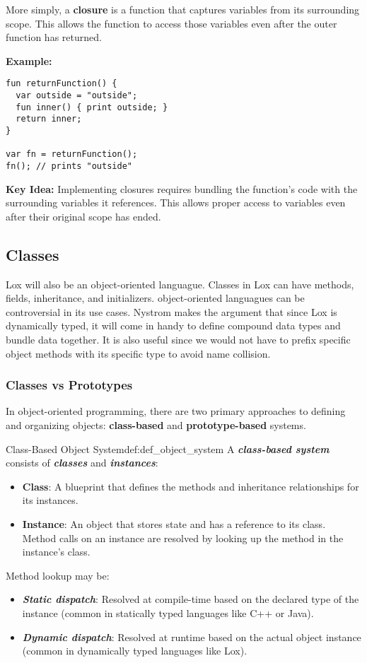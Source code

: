 \documentclass[12pt,a4paper]{article}
\newcommand{\newpar} {
  \vspace{1em}
  \noindent
}
\newcommand{\bemph}[1]{\textbf{\emph{#1}}}
\begin{document}
\newpar
More simply, a \textbf{closure} is a function that captures variables from its surrounding scope. This allows the function to access those variables even after the outer function has returned.

\newpar
\textbf{Example:}
\begin{lstlisting}
fun returnFunction() {
  var outside = "outside";
  fun inner() { print outside; }
  return inner;
}

var fn = returnFunction();
fn(); // prints "outside"
\end{lstlisting}

\newpar
\textbf{Key Idea:} Implementing closures requires bundling the function's code with the surrounding variables it references. This allows proper access to variables even after their original scope has ended.

\subsection{Classes}

Lox will also be an object-oriented languague. Classes in Lox can have methods, fields, inheritance, and initializers.
object-oriented languagues can be controversial in its use cases. Nystrom makes the argument that since Lox is
dynamically typed, it will come in handy to define compound data types and bundle data together.
It is also useful since we would not have to prefix specific object methods with its specific type to avoid name collision.

\subsubsection*{Classes vs Prototypes}

In object-oriented programming, there are two primary approaches to defining and organizing objects: \textbf{class-based} and \textbf{prototype-based} systems.

\begin{definition}{Class-Based Object System}{def:def_object_system}
	A \bemph{class-based system} consists of \bemph{classes} and \bemph{instances}:
	\begin{itemize}
		\item \textbf{Class}: A blueprint that defines the methods and inheritance relationships for its instances.
		\item \textbf{Instance}: An object that stores state and has a reference to its class. Method calls on an instance are resolved by looking up the method in the instance's class.
	\end{itemize}
	Method lookup may be:
	\begin{itemize}
		\item \bemph{Static dispatch}: Resolved at compile-time based on the declared type of the instance (common in statically typed languages like C++ or Java).
		\item \bemph{Dynamic dispatch}: Resolved at runtime based on the actual object instance (common in dynamically typed languages like Lox).
	\end{itemize}
\end{definition}
\end{document}
